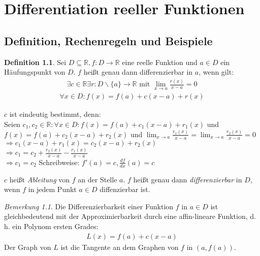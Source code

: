 \documentclass[ngerman,titlepage,twoside, parskip=half*]{scrreprt}
\newcommand*{\R}{\mathbb{R}}
\theoremstyle{plain}
\theoremstyle{definition}
\newtheorem{definition}{Definition}
\theoremstyle{remark}
\newtheorem*{remark}{Bemerkung}
\begin{document}
\chapter{Differentiation reeller Funktionen}
\section{Definition, Rechenregeln und Beispiele}

\begin{definition}
Sei $D\subseteq \R, f\colon D\rightarrow\R$ eine reelle Funktion und $a\in D$ ein Häuf\-ungs\-punkt von $D$. $f$
heißt genau dann differenzierbar in $a$, wenn gilt:
\begin{gather*}\exists c \in\R \exists r\colon D\backslash\{a\}\rightarrow\R \text{ mit } \lim_{x\rightarrow a}
\frac{r(x)}{x-a}=0\end{gather*}
\begin{gather*}\forall x \in D\colon f(x)=f(a)+c(x-a)+r(x)\end{gather*}
\end{definition}

$c$ ist eindeutig bestimmt, denn:\\
Seien $c_1,c_2 \in \R\colon \forall x \in D\colon f(x)=f(a)+c_1(x-a)+r_1(x)$ und $f(x)=f(a)+c_2(x-a)+r_2(x)$ und
$\lim_{x\rightarrow a}\frac{r_1(x)}{x-a}=\lim_{x\rightarrow a}\frac{r_2(x)}{x-a}=0$\\
$\Rightarrow c_1(x-a)+r_1(x)=c_2(x-a)+r_2(x)$\\
$\Rightarrow c_1=c_2+\frac{r_2(x)}{x-a}-\frac{r_1(x)}{x-a}$\\
$\Rightarrow c_1=c_2$
Schreibweise: $f'(a)=c, \frac{df}{dx}(a)=c$

$c$ heißt \emph{Ableitung} von $f$ an der Stelle $a$. $f$ heißt genau dann
\emph{differenzierbar} in $D$, wenn $f$ in jedem Punkt $a\in D$ diffenzierbar ist.

\begin{remark}
Die Differenzierbarkeit einer Funktion $f$ in $a\in D$ ist gleich\-be\-deu\-tend mit der Approximierbarkeit
durch eine affin-lineare Funktion, d.\,h. ein Polynom ersten Grades:
\begin{gather*}L(x)=f(a)+c(x-a)\end{gather*}
Der Graph von $L$ ist die Tangente an dem Graphen von $f$ in $(a,f(a))$.
\end{remark}
\end{document}
